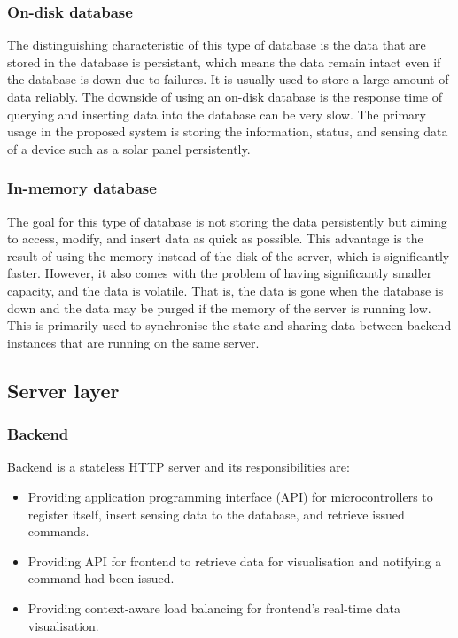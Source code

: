 \documentclass[../thesis.tex]{subfiles}
\begin{document}
\subsubsection{On-disk database}

The distinguishing characteristic of this type of database is the data that are stored in the database is persistant, which means the data remain intact even if the database is down due to failures. It is usually used to store a large amount of data reliably. The downside of using an on-disk database is the response time of querying and inserting data into the database can be very slow. The primary usage in the proposed system is storing the information, status, and sensing data of a device such as a solar panel persistently. 

\subsubsection{In-memory database}

The goal for this type of database is not storing the data persistently but aiming to access, modify, and insert data as quick as possible. This advantage is the result of using the memory instead of the disk of the server, which is significantly faster. However, it also comes with the problem of having significantly smaller capacity, and the data is volatile. That is, the data is gone when the database is down and the data may be purged if the memory of the server is running low. This is primarily used to synchronise the state and sharing data between backend instances that are running on the same server. 

\subsection{Server layer}

\subsubsection{Backend}

Backend is a stateless HTTP server and its responsibilities are:

\begin{itemize}
	\item Providing application programming interface (API) for microcontrollers to register itself, insert sensing data to the database, and retrieve issued commands.
	\item Providing API for frontend to retrieve data for visualisation and notifying a command had been issued.
	\item Providing context-aware load balancing for frontend's real-time data visualisation. 
\end{itemize}
\end{document}
